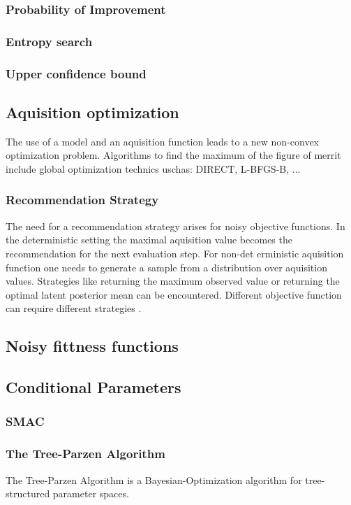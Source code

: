 \documentclass[english]{article}
\begin{document}
\subsubsection{Probability of Improvement}
\subsubsection{Entropy search}
\subsubsection{Upper confidence bound}

\subsection{Aquisition optimization}
The use of a model and an aquisition function leads to a new non-convex optimization problem. Algorithms to find the maximum of the figure of merrit include global optimization technics uschas: DIRECT, L-BFGS-B, ...

\subsubsection{Recommendation Strategy}
The need for a recommendation strategy arises for noisy objective functions. In the deterministic setting the maximal aquisition value becomes the recommendation for the next evaluation step. For non-det erministic aquisition function one needs to generate a sample from a distribution over aquisition values. Strategies like returning the maximum observed value or returning the optimal latent posterior mean can be encountered. Different objective function can require different strategies \cite{hoffman_modular_2014}.

\subsection{Noisy fittness functions}

\subsection{Conditional Parameters}

\subsubsection{SMAC}

\subsubsection{The Tree-Parzen Algorithm}
The Tree-Parzen Algorithm \cite{bergstra_algorithms_2011} is a Bayesian-Optimization algorithm for tree-structured parameter spaces.
\end{document}
